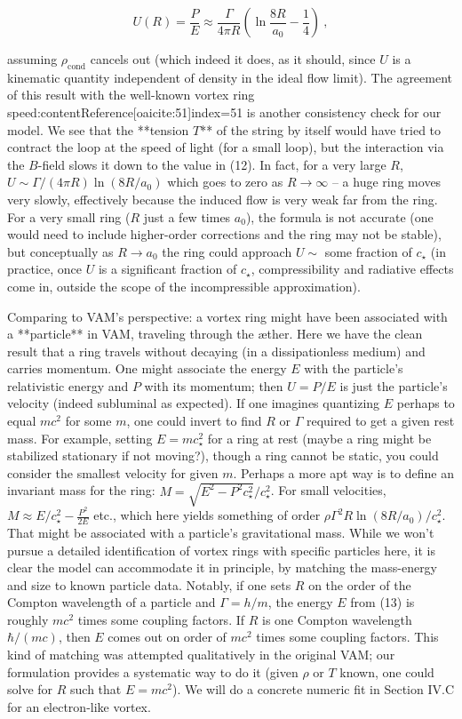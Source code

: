 \documentclass[12pt]{article}
\begin{document}
\[ U(R) = \frac{P}{E} \approx \frac{\Gamma}{4\pi R} \left(\ln\frac{8R}{a_0} - \frac{1}{4}\right)~, \] 

assuming $\rho_{\text{cond}}$ cancels out (which indeed it does, as it should, since $U$ is a kinematic quantity independent of density in the ideal flow limit). The agreement of this result with the well-known vortex ring speed:contentReference[oaicite:51]{index=51} is another consistency check for our model. We see that the **tension $T$** of the string by itself would have tried to contract the loop at the speed of light (for a small loop), but the interaction via the $B$-field slows it down to the value in (12). In fact, for a very large $R$, $U \sim \Gamma/(4\pi R)\ln(8R/a_0)$ which goes to zero as $R\to \infty$ – a huge ring moves very slowly, effectively because the induced flow is very weak far from the ring. For a very small ring ($R$ just a few times $a_0$), the formula is not accurate (one would need to include higher-order corrections and the ring may not be stable), but conceptually as $R \to a_0$ the ring could approach $U \sim$ some fraction of $c_\star$ (in practice, once $U$ is a significant fraction of $c_\star$, compressibility and radiative effects come in, outside the scope of the incompressible approximation). 

Comparing to VAM’s perspective: a vortex ring might have been associated with a **particle** in VAM, traveling through the æther. Here we have the clean result that a ring travels without decaying (in a dissipationless medium) and carries momentum. One might associate the energy $E$ with the particle’s relativistic energy and $P$ with its momentum; then $U = P/E$ is just the particle’s velocity (indeed subluminal as expected). If one imagines quantizing $E$ perhaps to equal $mc^2$ for some $m$, one could invert to find $R$ or $\Gamma$ required to get a given rest mass. For example, setting $E = m c_\star^2$ for a ring at rest (maybe a ring might be stabilized stationary if not moving?), though a ring cannot be static, you could consider the smallest velocity for given $m$. Perhaps a more apt way is to define an invariant mass for the ring: $M = \sqrt{E^2 - P^2 c_\star^2}/c_\star^2$. For small velocities, $M \approx E/c_\star^2 - \frac{P^2}{2E}$ etc., which here yields something of order $\rho \Gamma^2 R \ln(8R/a_0)/c_\star^2$. That might be associated with a particle’s gravitational mass. While we won’t pursue a detailed identification of vortex rings with specific particles here, it is clear the model can accommodate it in principle, by matching the mass-energy and size to known particle data. Notably, if one sets $R$ on the order of the Compton wavelength of a particle and $\Gamma = h/m$, the energy $E$ from (13) is roughly $mc^2$ times some coupling factors. If $R$ is one Compton wavelength $\hbar/(mc)$, then $E$ comes out on order of $mc^2$ times some coupling factors. This kind of matching was attempted qualitatively in the original VAM; our formulation provides a systematic way to do it (given $\rho$ or $T$ known, one could solve for $R$ such that $E = m c^2$). We will do a concrete numeric fit in Section IV.C for an electron-like vortex.
\end{document}
